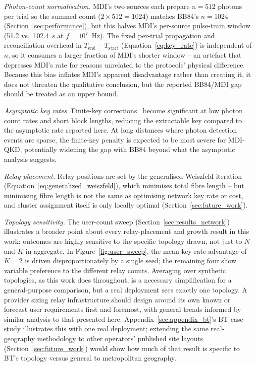 \documentclass[12pt]{article}
\begin{document}
\textit{Photon-count normalisation.} MDI's two sources each prepare $n=512$ photons per trial so the summed count ($2\times512=1024$) matches BB84's $n=1024$ (Section~\ref{sec:performance}), but this halves MDI's per-source pulse-train window (51.2 vs.\ 102.4~\textmu s at $f=10^7$~Hz). The fixed per-trial propagation and reconciliation overhead in $T_\text{end}-T_\text{start}$ (Equation~\ref{eq:key_rate}) is independent of $n$, so it consumes a larger fraction of MDI's shorter window -- an artefact that depresses MDI's rate for reasons unrelated to the protocols' physical difference. Because this bias inflates MDI's apparent disadvantage rather than creating it, it does not threaten the qualitative conclusion, but the reported BB84/MDI gap should be treated as an upper bound.

\textit{Asymptotic key rates.} Finite-key corrections~\cite{Song-2012} become significant at low photon count rates and short block lengths, reducing the extractable key compared to the asymptotic rate reported here. At long distances where photon detection events are sparse, the finite-key penalty is expected to be most severe for MDI-QKD, potentially widening the gap with BB84 beyond what the asymptotic analysis suggests.

\textit{Relay placement.} Relay positions are set by the generalised Weiszfeld iteration (Equation~\ref{eq:generalized_weiszfeld}), which minimises total fibre length -- but minimising fibre length is not the same as optimising network key rate or cost, and cluster assignment itself is only locally optimal (Section~\ref{sec:future_work}).

\textit{Topology sensitivity.} The user-count sweep (Section~\ref{sec:results_network}) illustrates a broader point about every relay-placement and growth result in this work: outcomes are highly sensitive to the specific topology drawn, not just to $N$ and $K$ in aggregate. In Figure~\ref{fig:user_sweep}, the mean key-rate advantage of $K=2$ is driven disproportionately by a single seed; the remaining four show variable preference to the different relay counts. Averaging over synthetic topologies, as this work does throughout, is a necessary simplification for a general-purpose comparison, but a real deployment sees exactly one topology. A provider sizing relay infrastructure should design around its own known or forecast user requirements first and foremost, with general trends informed by similar analysis to that presented here. Appendix~\ref{sec:appendix_bt}'s BT case study illustrates this with one real deployment; extending the same real-geography methodology to other operators' published site layouts (Section~\ref{sec:future_work}) would show how much of that result is specific to BT's topology versus general to metropolitan geography.
\end{document}
